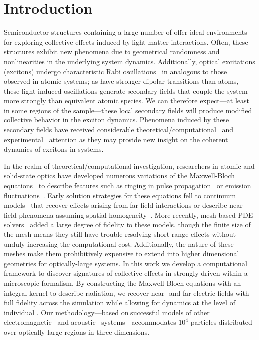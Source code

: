 \section{\label{section:introduction}Introduction}

Semiconductor structures containing a large number of \qds{} offer ideal environments for exploring collective effects induced by light-matter interactions.
Often, these structures exhibit new phenomena due to geometrical randomness and nonlinearities in the underlying system dynamics.
Additionally, optical excitations (excitons) undergo characteristic Rabi oscillations~\cite{Stievater2001,Kamada2001,Htoon2002} in \qds{} analogous to those observed in atomic systems; as \qds{} have stronger dipolar transitions than atoms, these light-induced oscillations generate secondary fields that couple the system more strongly than equivalent atomic species.
We can therefore expect---at least in some regions of the sample---these local secondary fields will produce modified collective behavior in the exciton dynamics.
Phenomena induced by these secondary fields have received considerable theoretical/computational~\cite{Slepyan2002,Slepyan2004} and experimental~\cite{Asakura2013} attention as they may provide new insight on the coherent dynamics of excitons in \qd{} systems.

In the realm of theoretical/computational investigation, researchers in atomic and solid-state optics have developed numerous variations of the Maxwell-Bloch equations~\cite{Gross1982} to describe features such as ringing in pulse propagation~\cite{Burnham1969,MacGillivray1976} or emission fluctuations~\cite{Haake1979}.
Early solution strategies for these equations fell to continuum models~\cite{Rehler1971,MacGillivray1976} that recover effects arising from far-field interactions or describe near-field phenomena assuming spatial homogeneity~\cite{Stroud1972}.
More recently, mesh-based PDE solvers~\cite{Vanneste2001,Fratalocchi2008,Bachelard2015} added a large degree of fidelity to these models, though the finite size of the mesh means they still have trouble resolving short-range effects without unduly increasing the computational cost.
Additionally, the nature of these meshes make them prohibitively expensive to extend into higher dimensional geometries for optically-large systems.
In this work we develop a computational framework to discover signatures of collective effects in strongly-driven \qds{} within a microscopic formalism.
By constructing the Maxwell-Bloch equations with an integral kernel to describe radiation, we recover near- and far-electric fields with full fidelity across the simulation while allowing for dynamics at the level of individual \qds{}.
Our methodology---based on successful models of other electromagnetic~\cite{Shanker2000,Pray2012,Pray2014} and acoustic~\cite{Ergin1999a,Ergin1999b,Glosser2016} systems---accommodates $10^4$ particles distributed over optically-large regions in three dimensions.

